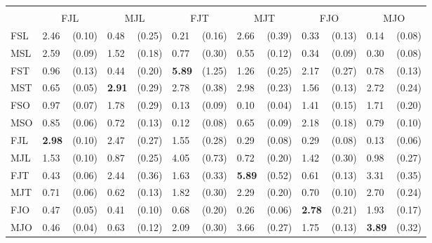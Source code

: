\begin{tabular}{ll@{\,\,\,}rl@{\,\,\,}rl@{\,\,\,}rl@{\,\,\,}rl@{\,\,\,}rl@{\,\,\,}r}
\phantom{\textbf{Receiver}} &\\
    & \multicolumn{2}{c}{\textnormal{FJL}}
    & \multicolumn{2}{c}{\textnormal{MJL}}
    & \multicolumn{2}{c}{\textnormal{FJT}}
    & \multicolumn{2}{c}{\textnormal{MJT}}
    & \multicolumn{2}{c}{\textnormal{FJO}}
    & \multicolumn{2}{c}{\textnormal{MJO}} \\
    \cmidrule(lr){2-3}
    \cmidrule(lr){4-5}
    \cmidrule(lr){6-7}
    \cmidrule(lr){8-9}
    \cmidrule(lr){10-11}
    \cmidrule(lr){12-13}
    \textnormal{FSL} & 2.46 & (0.10) & 0.48 & (0.25) & 0.21 & (0.16) & 2.66 & (0.39) & 0.33 & (0.13) & 0.14 & (0.08) \\
    \textnormal{MSL} & 2.59 & (0.09) & 1.52 & (0.18) & 0.77 & (0.30) & 0.55 & (0.12) & 0.34 & (0.09) & 0.30 & (0.08) \\
    \textnormal{FST} & 0.96 & (0.13) & 0.44 & (0.20) & \textbf{5.89} & (1.25) & 1.26 & (0.25) & 2.17 & (0.27) & 0.78 & (0.13) \\
    \textnormal{MST} & 0.65 & (0.05) & \textbf{2.91} & (0.29) & 2.78 & (0.38) & 2.98 & (0.23) & 1.56 & (0.13) & 2.72 & (0.24) \\
    \textnormal{FSO} & 0.97 & (0.07) & 1.78 & (0.29) & 0.13 & (0.09) & 0.10 & (0.04) & 1.41 & (0.15) & 1.71 & (0.20) \\
    \textnormal{MSO} & 0.85 & (0.06) & 0.72 & (0.13) & 0.12 & (0.08) & 0.65 & (0.09) & 2.18 & (0.18) & 0.79 & (0.10) \\
    \textnormal{FJL} & \textbf{2.98} & (0.10) & 2.47 & (0.27) & 1.55 & (0.28) & 0.29 & (0.08) & 0.29 & (0.08) & 0.13 & (0.06) \\
    \textnormal{MJL} & 1.53 & (0.10) & 0.87 & (0.25) & 4.05 & (0.73) & 0.72 & (0.20) & 1.42 & (0.30) & 0.98 & (0.27) \\
    \textnormal{FJT} & 0.43 & (0.06) & 2.44 & (0.36) & 1.63 & (0.33) & \textbf{5.89} & (0.52) & 0.61 & (0.13) & 3.31 & (0.35) \\
    \textnormal{MJT} & 0.71 & (0.06) & 0.62 & (0.13) & 1.82 & (0.30) & 2.29 & (0.20) & 0.70 & (0.10) & 2.70 & (0.24) \\
    \textnormal{FJO} & 0.47 & (0.05) & 0.41 & (0.10) & 0.68 & (0.20) & 0.26 & (0.06) & \textbf{2.78} & (0.21) & 1.93 & (0.17) \\
    \textnormal{MJO} & 0.46 & (0.04) & 0.63 & (0.12) & 2.09 & (0.30) & 3.66 & (0.27) & 1.75 & (0.13) & \textbf{3.89} & (0.32) \\
\bottomrule
\end{tabular}